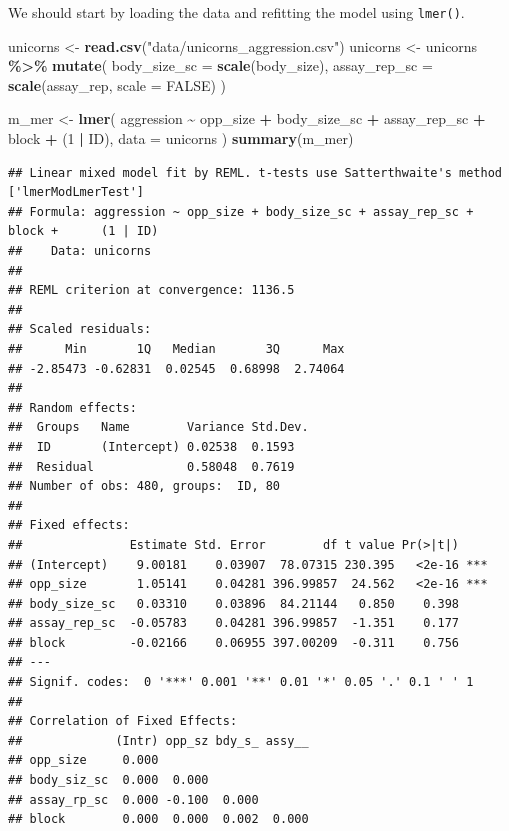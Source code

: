 \documentclass[
  12pt,
]{book}
\newenvironment{Shaded}{\begin{snugshade}}{\end{snugshade}}
\newcommand{\DataTypeTok}[1]{\textcolor[rgb]{0.13,0.29,0.53}{#1}}
\newcommand{\DecValTok}[1]{\textcolor[rgb]{0.00,0.00,0.81}{#1}}
\newcommand{\KeywordTok}[1]{\textcolor[rgb]{0.13,0.29,0.53}{\textbf{#1}}}
\newcommand{\NormalTok}[1]{#1}
\newcommand{\OperatorTok}[1]{\textcolor[rgb]{0.81,0.36,0.00}{\textbf{#1}}}
\newcommand{\OtherTok}[1]{\textcolor[rgb]{0.56,0.35,0.01}{#1}}
\newcommand{\StringTok}[1]{\textcolor[rgb]{0.31,0.60,0.02}{#1}}
\begin{document}
We should start by loading the data and refitting the model using \texttt{lmer()}.

\begin{Shaded}
\begin{Highlighting}[]
\NormalTok{unicorns \textless{}{-}}\StringTok{ }\KeywordTok{read.csv}\NormalTok{(}\StringTok{"data/unicorns\_aggression.csv"}\NormalTok{)}
\NormalTok{unicorns \textless{}{-}}\StringTok{ }\NormalTok{unicorns }\OperatorTok{\%\textgreater{}\%}
\StringTok{  }\KeywordTok{mutate}\NormalTok{(}
    \DataTypeTok{body\_size\_sc =} \KeywordTok{scale}\NormalTok{(body\_size),}
    \DataTypeTok{assay\_rep\_sc =} \KeywordTok{scale}\NormalTok{(assay\_rep, }\DataTypeTok{scale =} \OtherTok{FALSE}\NormalTok{)}
\NormalTok{  )}

\NormalTok{m\_mer \textless{}{-}}\StringTok{ }\KeywordTok{lmer}\NormalTok{(}
\NormalTok{    aggression }\OperatorTok{\textasciitilde{}}\StringTok{ }\NormalTok{opp\_size }\OperatorTok{+}\StringTok{ }\NormalTok{body\_size\_sc }\OperatorTok{+}\StringTok{ }\NormalTok{assay\_rep\_sc }\OperatorTok{+}\StringTok{ }\NormalTok{block}
      \OperatorTok{+}\StringTok{ }\NormalTok{(}\DecValTok{1} \OperatorTok{|}\StringTok{ }\NormalTok{ID),}
    \DataTypeTok{data =}\NormalTok{ unicorns}
\NormalTok{)}
\KeywordTok{summary}\NormalTok{(m\_mer)}
\end{Highlighting}
\end{Shaded}

\begin{verbatim}
## Linear mixed model fit by REML. t-tests use Satterthwaite's method ['lmerModLmerTest']
## Formula: aggression ~ opp_size + body_size_sc + assay_rep_sc + block +      (1 | ID)
##    Data: unicorns
## 
## REML criterion at convergence: 1136.5
## 
## Scaled residuals: 
##      Min       1Q   Median       3Q      Max 
## -2.85473 -0.62831  0.02545  0.68998  2.74064 
## 
## Random effects:
##  Groups   Name        Variance Std.Dev.
##  ID       (Intercept) 0.02538  0.1593  
##  Residual             0.58048  0.7619  
## Number of obs: 480, groups:  ID, 80
## 
## Fixed effects:
##               Estimate Std. Error        df t value Pr(>|t|)    
## (Intercept)    9.00181    0.03907  78.07315 230.395   <2e-16 ***
## opp_size       1.05141    0.04281 396.99857  24.562   <2e-16 ***
## body_size_sc   0.03310    0.03896  84.21144   0.850    0.398    
## assay_rep_sc  -0.05783    0.04281 396.99857  -1.351    0.177    
## block         -0.02166    0.06955 397.00209  -0.311    0.756    
## ---
## Signif. codes:  0 '***' 0.001 '**' 0.01 '*' 0.05 '.' 0.1 ' ' 1
## 
## Correlation of Fixed Effects:
##             (Intr) opp_sz bdy_s_ assy__
## opp_size     0.000                     
## body_siz_sc  0.000  0.000              
## assay_rp_sc  0.000 -0.100  0.000       
## block        0.000  0.000  0.002  0.000
\end{verbatim}
\end{document}
